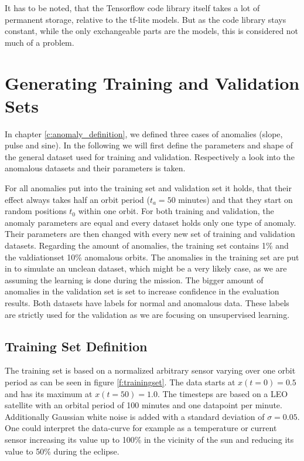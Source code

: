 	It has to be noted, that the Tensorflow code library itself takes a lot of permanent storage, relative to the tf-lite models. But as the code library stays constant, while the only exchangeable parts are the models, this is considered not much of a problem.
	
\section{Generating Training and Validation Sets}
In chapter \ref{c:anomaly_definition}, we defined three cases of anomalies (slope, pulse and sine). In the following we will first define the parameters and shape of the general dataset used for training and validation. Respectively a look into the anomalous datasets and their parameters is taken.

For all anomalies put into the training set and validation set it holds, that their effect always takes half an orbit period ($t_a=50$ minutes) and that they start on random positions $t_0$ within one orbit. For both training and validation, the anomaly parameters are equal and every dataset holds only one type of anomaly. Their parameters are then changed with every new set of training and validation datasets. \newline
Regarding the amount of anomalies, the training set contains 1\% and the valdiationset 10\% anomalous orbits. The anomalies in the training set are put in to simulate an unclean dataset, which might be a very likely case, as we are assuming the learning is done during the mission. The bigger amount of anomalies in the validation set is set to increase confidence in the evaluation results. \newline
Both datasets have labels for normal and anomalous data. These labels are strictly used for the validation as we are focusing on unsupervised learning.

	\subsection{Training Set Definition}
	The training set is based on a normalized arbitrary sensor varying over one orbit period as can be seen in figure \ref{f:trainingset}. The data starts at $x(t=0) = 0.5$ and has its maximum at $x(t=50) = 1.0$. The timesteps are based on a LEO satellite with an orbital period of 100 minutes and one datapoint per minute. Additionally Gaussian white noise is added with a standard deviation of $\sigma = 0.05$. \newline
	One could interpret the data-curve for example as a temperature or current sensor increasing its value up to 100\% in the vicinity of the sun and reducing its value to 50\% during the eclipse.
	
